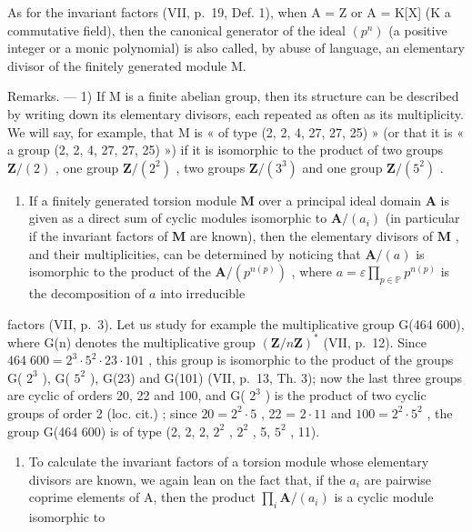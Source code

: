 As for the invariant factors (VII, p.~19, Def. 1), when A = Z or A = K{[}X{]} (K a commutative field), then the canonical generator of the ideal \((p^{n})\) (a positive integer or a monic polynomial) is also called, by abuse of language, an elementary divisor of the finitely generated module M.

Remarks. --- 1) If M is a finite abelian group, then its structure can be described by writing down its elementary divisors, each repeated as often as its multiplicity. We will say, for example, that M is « of type (2, 2, 4, 27, 27, 25) » (or that it is « a group (2, 2, 4, 27, 27, 25) ») if it is isomorphic to the product of two groups \(\mathbf{Z}/(2)\) , one group \(\mathbf{Z}/(2^{2})\) , two groups \(\mathbf{Z}/(3^{3})\) and one group \(\mathbf{Z}/(5^{2})\) .

\begin{enumerate}
\def\labelenumi{\arabic{enumi})}
\setcounter{enumi}{1}
\tightlist
\item
  If a finitely generated torsion module \(\mathbf{M}\) over a principal ideal domain \(\mathbf{A}\) is given as a direct sum of cyclic modules isomorphic to \(\mathbf{A} / (a_i)\) (in particular if the invariant factors of \(\mathbf{M}\) are known), then the elementary divisors of \(\mathbf{M}\) , and their multiplicities, can be determined by noticing that \(\mathbf{A} / (a)\) is isomorphic to the product of the \(\mathbf{A} / (p^{n(p)})\) , where \(a = \varepsilon \prod_{p \in \mathbb{P}} p^{n(p)}\) is the decomposition of \(a\) into irreducible
\end{enumerate}

factors (VII, p.~3). Let us study for example the multiplicative group G(464 600), where G(n) denotes the multiplicative group \((\mathbf{Z}/n\mathbf{Z})^{*}\) (VII, p.~12). Since \(464\;600 = 2^{3}\cdot5^{2}\cdot23\cdot101\) , this group is isomorphic to the product of the groups G( \(2^{3}\) ), G( \(5^{2}\) ), G(23) and G(101) (VII, p.~13, Th. 3); now the last three groups are cyclic of orders 20, 22 and 100, and G( \(2^{3}\) ) is the product of two cyclic groups of order 2 (loc. cit.) ; since \(20 = 2^{2}\cdot5\) , 22 = \(2\cdot 11\) and \(100 = 2^{2}\cdot5^{2}\) , the group G(464 600) is of type (2, 2, 2, \(2^{2}\) , \(2^{2}\) , 5, \(5^{2}\) , 11).

\begin{enumerate}
\def\labelenumi{\arabic{enumi})}
\setcounter{enumi}{2}
\tightlist
\item
  To calculate the invariant factors of a torsion module whose elementary divisors are known, we again lean on the fact that, if the \(a_{i}\) are pairwise coprime elements of A, then the product \(\prod_{i}\mathbf{A}/(a_{i})\) is a cyclic module isomorphic to
\end{enumerate}

